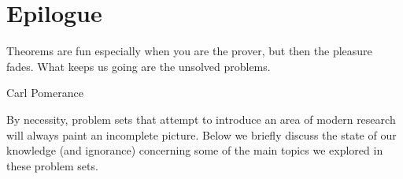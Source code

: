 %
%
%

\chapter{Epilogue}
\label{notes} %

\epigraph{Theorems are fun especially when you are the prover, but then the pleasure fades. What keeps us going are the unsolved problems.}{Carl Pomerance}

\noindent By necessity, problem sets that attempt to introduce an area of modern research will always paint an incomplete picture. Below we briefly discuss the state of our knowledge (and ignorance) concerning some of the main topics we explored in these problem sets.


